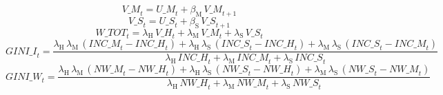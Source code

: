 \begin{dmath}
{V\_M}_{t}={U\_M}_{t}+{\beta_\mathrm{M}}\, {V\_M}_{t+1}
\end{dmath}
\begin{dmath}
{V\_S}_{t}={U\_S}_{t}+{\beta_\mathrm{S}}\, {V\_S}_{t+1}
\end{dmath}
\begin{dmath}
{W\_TOT}_{t}={\lambda_\mathrm{H}}\, {V\_H}_{t}+{\lambda_\mathrm{M}}\, {V\_M}_{t}+{\lambda_\mathrm{S}}\, {V\_S}_{t}
\end{dmath}
\begin{dmath}
{GINI\_I}_{t}=\frac{{\lambda_\mathrm{H}}\, {\lambda_\mathrm{M}}\, \left({INC\_M}_{t}-{INC\_H}_{t}\right)+{\lambda_\mathrm{H}}\, {\lambda_\mathrm{S}}\, \left({INC\_S}_{t}-{INC\_H}_{t}\right)+{\lambda_\mathrm{M}}\, {\lambda_\mathrm{S}}\, \left({INC\_S}_{t}-{INC\_M}_{t}\right)}{{\lambda_\mathrm{H}}\, {INC\_H}_{t}+{\lambda_\mathrm{M}}\, {INC\_M}_{t}+{\lambda_\mathrm{S}}\, {INC\_S}_{t}}
\end{dmath}
\begin{dmath}
{GINI\_W}_{t}=\frac{{\lambda_\mathrm{H}}\, {\lambda_\mathrm{M}}\, \left({NW\_M}_{t}-{NW\_H}_{t}\right)+{\lambda_\mathrm{H}}\, {\lambda_\mathrm{S}}\, \left({NW\_S}_{t}-{NW\_H}_{t}\right)+{\lambda_\mathrm{M}}\, {\lambda_\mathrm{S}}\, \left({NW\_S}_{t}-{NW\_M}_{t}\right)}{{\lambda_\mathrm{H}}\, {NW\_H}_{t}+{\lambda_\mathrm{M}}\, {NW\_M}_{t}+{\lambda_\mathrm{S}}\, {NW\_S}_{t}}
\end{dmath}
